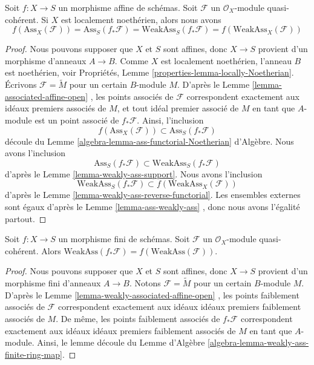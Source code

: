 \begin{lemma}
\label{lemma-ass-functorial-equal}
Soit  $f : X \to S$  un morphisme affine de schémas. Soit  $\mathcal{F}$  un
 $\mathcal{O}_X$-module quasi-cohérent. Si  $X$  est localement noethérien,
alors nous avons
$$
f(\text{Ass}_X(\mathcal{F})) =
\text{Ass}_S(f_*\mathcal{F}) =
\text{WeakAss}_S(f_*\mathcal{F}) =
f(\text{WeakAss}_X(\mathcal{F}))
$$
\end{lemma}

\begin{proof}
Nous pouvons supposer que  $X$  et  $S$  sont affines, donc
 $X \to S$  provient d'un morphisme d'anneaux  $A \to B$. Comme  $X$ 
est localement noethérien, l'anneau  $B$  est noethérien, voir Propriétés,
Lemme  \ref{properties-lemma-locally-Noetherian}. Écrivons  $\mathcal{F} = \widetilde M$  pour un certain  $B$-module
 $M$. D'après le Lemme  \ref{lemma-associated-affine-open} , les points associés de  $\mathcal{F}$ 
correspondent exactement aux idéaux premiers associés de  $M$, et tout
idéal premier associé de  $M$  en tant que  $A$-module est un point
associé de  $f_*\mathcal{F}$. Ainsi, l'inclusion
$$
f(\text{Ass}_X(\mathcal{F})) \subset \text{Ass}_S(f_*\mathcal{F})
$$
découle du Lemme  \ref{algebra-lemma-ass-functorial-Noetherian} d'Algèbre. Nous avons l'inclusion
$$
\text{Ass}_S(f_*\mathcal{F}) \subset \text{WeakAss}_S(f_*\mathcal{F})
$$
d'après le Lemme  \ref{lemma-weakly-ass-support}. Nous avons l'inclusion
$$
\text{WeakAss}_S(f_*\mathcal{F}) \subset f(\text{WeakAss}_X(\mathcal{F}))
$$
d'après le Lemme  \ref{lemma-weakly-ass-reverse-functorial}. Les ensembles externes sont égaux d'après le Lemme
 \ref{lemma-ass-weakly-ass} , donc nous avons l'égalité partout.
\end{proof}

\begin{lemma}
\label{lemma-weakly-associated-finite}
Soit  $f : X \to S$  un morphisme fini de schémas. Soit  $\mathcal{F}$  un
 $\mathcal{O}_X$-module quasi-cohérent. Alors  $\text{WeakAss}(f_*\mathcal{F}) = f(\text{WeakAss}(\mathcal{F}))$.
\end{lemma}

\begin{proof}
Nous pouvons supposer que  $X$  et  $S$  sont affines, donc
 $X \to S$  provient d'un morphisme fini d'anneaux  $A \to B$. Notons
 $\mathcal{F} = \widetilde M$  pour un certain  $B$-module  $M$. D'après le Lemme
 \ref{lemma-weakly-associated-affine-open} , les points faiblement associés de  $\mathcal{F}$  correspondent
exactement aux idéaux idéaux premiers faiblement associés de  $M$. De
même, les points faiblement associés de  $f_*\mathcal{F}$  correspondent exactement aux
idéaux idéaux premiers faiblement associés de  $M$  en tant que
 $A$-module. Ainsi, le lemme découle du Lemme d'Algèbre  \ref{algebra-lemma-weakly-ass-finite-ring-map}.
\end{proof}

